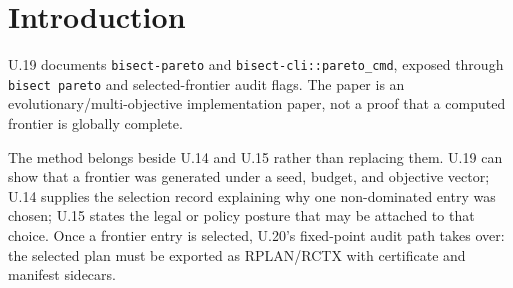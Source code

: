 \section{Introduction}

U.19 documents \texttt{bisect-pareto} and \texttt{bisect-cli::pareto\_cmd},
exposed through \texttt{bisect pareto} and selected-frontier audit flags. The
paper is an evolutionary/multi-objective implementation paper, not a proof that
a computed frontier is globally complete.

The method belongs beside U.14 and U.15 rather than replacing them. U.19 can
show that a frontier was generated under a seed, budget, and objective vector;
U.14 supplies the selection record explaining why one non-dominated entry was
chosen; U.15 states the legal or policy posture that may be attached to that
choice. Once a frontier entry is selected, U.20's fixed-point audit path takes
over: the selected plan must be exported as RPLAN/RCTX with certificate and
manifest sidecars.
